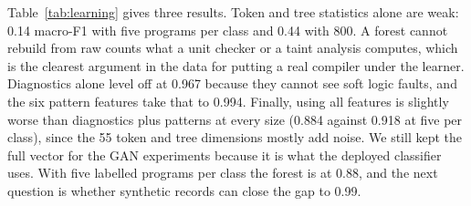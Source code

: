 Table~\ref{tab:learning} gives three results. Token and tree statistics alone are weak: 0.14 macro-F1 with five programs
per class and 0.44 with 800. A forest cannot rebuild from raw counts what a unit checker or a taint analysis computes,
which is the clearest argument in the data for putting a real compiler under the learner. Diagnostics alone level off
at 0.967 because they cannot see soft logic faults, and the six pattern features take that to 0.994. Finally, using all
features is slightly worse than diagnostics plus patterns at every size (0.884 against 0.918 at five per class), since
the 55 token and tree dimensions mostly add noise. We still kept the full vector for the GAN experiments because it is
what the deployed classifier uses. With five labelled programs per class the forest is at 0.88, and the next question
is whether synthetic records can close the gap to 0.99.
